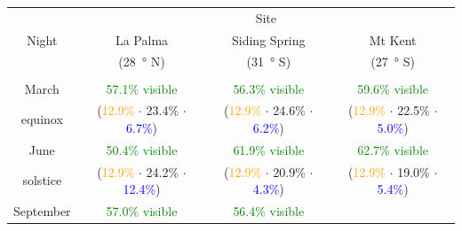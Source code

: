\begin{colsection}
\begin{colsection}
\begin{table}[t]
    \begin{center}
        \begin{tabular}{c|ccc} %
            \multirow{3}{*}{Night} & \multicolumn{3}{c}{Site} \\
                      & La Palma             & Siding Spring  & Mt Kent \\
                      & (\SI{28}{\degree} N) &  (\SI{31}{\degree} S) &  (\SI{27}{\degree} S) \\
                      \midrule
                      \\
            March     & \textcolor{Green}{57.1\% visible}
                      & \textcolor{Green}{56.3\% visible}
                      & \textcolor{Green}{59.6\% visible}
                      \\
            equinox   & {\scriptsize(\textcolor{Orange}{12.9\%} $\cdot$
                                     \textcolor{NavyBlue}{23.4\%} $\cdot$
                                     \textcolor{Blue}{6.7\%})}
                      & {\scriptsize(\textcolor{Orange}{12.9\%} $\cdot$
                                     \textcolor{NavyBlue}{24.6\%} $\cdot$
                                     \textcolor{Blue}{6.2\%})}
                      & {\scriptsize(\textcolor{Orange}{12.9\%} $\cdot$
                                     \textcolor{NavyBlue}{22.5\%} $\cdot$
                                     \textcolor{Blue}{5.0\%})}
                      \\[0.5cm]
            June      & \textcolor{Green}{50.4\% visible}
                      & \textcolor{Green}{61.9\% visible}
                      & \textcolor{Green}{62.7\% visible}
                      \\
            solstice  & {\scriptsize(\textcolor{Orange}{12.9\%} $\cdot$
                                     \textcolor{NavyBlue}{24.2\%} $\cdot$
                                     \textcolor{Blue}{12.4\%})}
                      & {\scriptsize(\textcolor{Orange}{12.9\%} $\cdot$
                                     \textcolor{NavyBlue}{20.9\%} $\cdot$
                                     \textcolor{Blue}{4.3\%})}
                      & {\scriptsize(\textcolor{Orange}{12.9\%} $\cdot$
                                     \textcolor{NavyBlue}{19.0\%} $\cdot$
                                     \textcolor{Blue}{5.4\%})}
                      \\[0.5cm]
            September & \textcolor{Green}{57.0\% visible}
                      & \textcolor{Green}{56.4\% visible}

\end{tabular}
\end{center}
\end{table}
\end{colsection}
\end{colsection}
